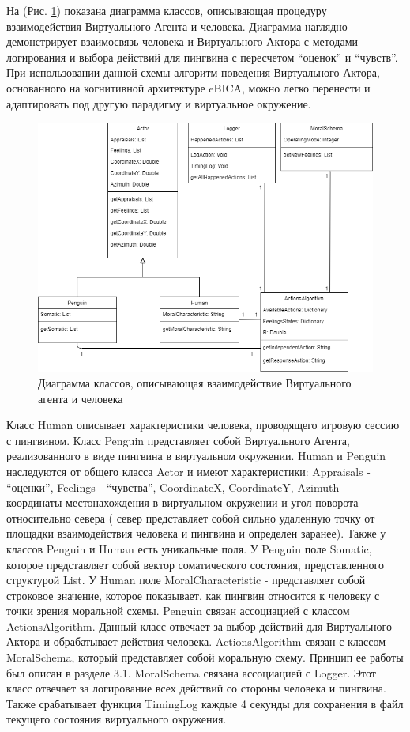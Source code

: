 На (Рис. \ref{pic:oldcmodel2}) показана диаграмма классов, описывающая процедуру взаимодействия Виртуального Агента и человека. 
Диаграмма наглядно демонстрирует взаимосвязь человека и 
Виртуального Актора с методами логирования и выбора действий для пингвина с пересчетом “оценок” и “чувств”. 
При использовании данной схемы алгоритм поведения Виртуального Актора, основанного на когнитивной архитектуре eBICA, можно легко перенести и адаптировать 
под другую парадигму и виртуальное окружение.

\begin{figure}[h]
\includegraphics[width=0.75\columnwidth]{./img/oldcmodel2.png}
\centering
\caption{Диаграмма классов, описывающая взаимодействие Виртуального агента и человека}
\label{pic:oldcmodel2}
\end{figure}


Класс Human описывает характеристики человека, проводящего игровую сессию с пингвином. 
Класс Penguin представляет собой Виртуального Агента, реализованного в виде пингвина в виртуальном окружении. 
Human и Penguin наследуются от общего класса Actor и имеют характеристики: Appraisals - “оценки”, Feelings - “чувства”, 
CoordinateX, CoordinateY, Azimuth - координаты местонахождения в виртуальном окружении и угол поворота относительно севера (
север представляет собой сильно удаленную точку от площадки взаимодействия человека и пингвина и определен заранее).  
Также у классов Penguin и Human есть уникальные поля. У Penguin поле Somatic, которое представляет собой вектор соматического состояния, 
представленного структурой List. У Human поле MoralCharacteristic - представляет собой строковое значение, которое показывает, 
как пингвин относится к человеку с точки зрения моральной схемы. Penguin связан ассоциацией с классом ActionsAlgorithm. 
Данный класс отвечает за выбор действий для Виртуального Актора и обрабатывает действия человека. ActionsAlgorithm связан с классом MoralSchema, 
который представляет собой моральную схему. Принцип ее работы был описан в разделе 3.1. MoralSchema связана ассоциацией с Logger. 
Этот класс отвечает за логирование всех действий со стороны человека и пингвина. Также срабатывает функция TimingLog каждые 4 
секунды для сохранения в файл текущего состояния виртуального окружения.

